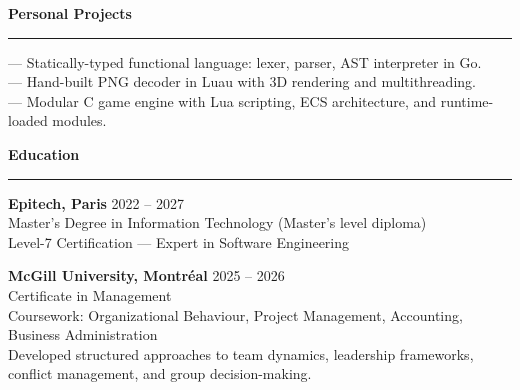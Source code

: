 \documentclass{article}
\begin{document}
\par\vspace{5pt}

{\large\bfseries Personal Projects}
\par\vspace{-8pt}
\rule{\linewidth}{0.4pt}
\par\vspace{5pt}

\hspace*{5pt}{\bfseries ZZZcript} --- Statically-typed functional language: lexer, parser, AST interpreter in Go. \\
\hspace*{5pt}{\bfseries libpng-roblox} --- Hand-built PNG decoder in Luau with 3D rendering and multithreading. \\
\hspace*{5pt}{\bfseries rodox} --- Modular C game engine with Lua scripting, ECS architecture, and runtime-loaded modules.

\par\vspace{5pt}

{\large\bfseries Education}
\par\vspace{-8pt}
\rule{\linewidth}{0.4pt}
\par\vspace{5pt}

{\bfseries Epitech, Paris} \hfill 2022 -- 2027 \\
Master's Degree in Information Technology (Master's level diploma) \\
Level-7 Certification --- Expert in Software Engineering

\vspace{6pt}

{\bfseries McGill University, Montréal} \hfill 2025 -- 2026 \\
Certificate in Management \\
Coursework: Organizational Behaviour, Project Management, Accounting, Business Administration \\
{\small Developed structured approaches to team dynamics, leadership frameworks, conflict management, and group decision-making.}
\end{document}
